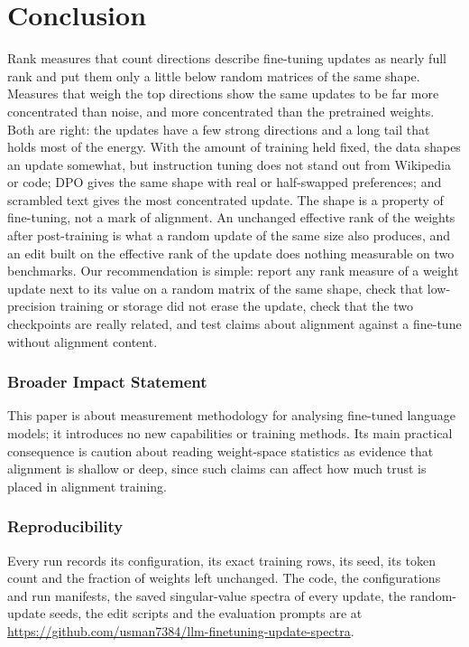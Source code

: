 \section{Conclusion}
\label{sec:conclusion}

Rank measures that count directions describe fine-tuning updates as nearly
full rank and put them only a little below random matrices of the same shape.
Measures
that weigh the top directions show the same updates to be far more
concentrated than noise, and more concentrated than the pretrained weights.
Both are right: the updates have a few strong directions and a long tail that
holds most of the energy. With the amount of training held fixed, the data
shapes an update somewhat, but instruction tuning does not stand out from
Wikipedia or code; DPO gives the same shape with real or half-swapped
preferences; and scrambled text gives the most concentrated
update. The shape is a property of fine-tuning, not a mark of alignment. An
unchanged effective rank of the weights after post-training is
what a random update of the same size also produces, and an edit built on
the effective rank of the update does nothing measurable on two benchmarks.
Our
recommendation is simple: report any rank measure of a weight update next to
its value on a random matrix of the same shape, check that low-precision
training or storage did not erase the update, check that the two checkpoints
are really related, and test claims about alignment against a fine-tune
without alignment content.

\subsubsection*{Broader Impact Statement}
This paper is about measurement methodology for analysing fine-tuned language
models; it introduces no new capabilities or training methods. Its main
practical consequence is caution about reading weight-space statistics as
evidence that alignment is shallow or deep, since such claims can affect how
much trust is placed in alignment training.

\subsubsection*{Reproducibility}
Every run records its configuration, its exact training rows, its seed, its
token count and the fraction of weights left unchanged. The code, the
configurations and run manifests, the saved singular-value spectra of every
update, the random-update seeds, the edit scripts and the evaluation prompts
are at \url{https://github.com/usman7384/llm-finetuning-update-spectra}.
